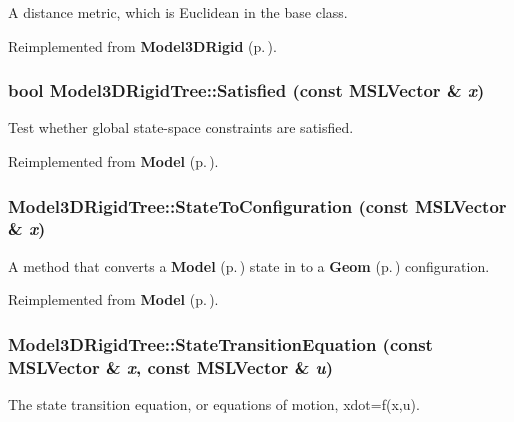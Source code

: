 A distance metric, which is Euclidean in the base class.



Reimplemented from {\bf Model3DRigid} {\rm (p.\,\pageref{classModel3DRigid_a4})}.
\subsubsection{\setlength{\rightskip}{0pt plus 5cm}bool Model3DRigid\-Tree::Satisfied (const {\bf MSLVector} \& {\em x})\hspace{0.3cm}{\tt  [virtual]}}\label{classModel3DRigidTree_a6}


Test whether global state-space constraints are satisfied.



Reimplemented from {\bf Model} {\rm (p.\,\pageref{classModel_a4})}.
\subsubsection{ Model3DRigid\-Tree::State\-To\-Configuration (const {\bf MSLVector} \& {\em x})\hspace{0.3cm}{\tt  [virtual]}}\label{classModel3DRigidTree_a3}


A method that converts a {\bf Model} {\rm (p.\,\pageref{classModel})} state in to a {\bf Geom} {\rm (p.\,\pageref{classGeom})} configuration.



Reimplemented from {\bf Model} {\rm (p.\,\pageref{classModel_a8})}.
\subsubsection{ Model3DRigid\-Tree::State\-Transition\-Equation (const {\bf MSLVector} \& {\em x}, const {\bf MSLVector} \& {\em u})\hspace{0.3cm}{\tt  [virtual]}}\label{classModel3DRigidTree_a2}


The state transition equation, or equations of motion, xdot=f(x,u).



